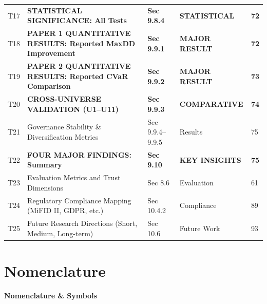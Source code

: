 \documentclass[11pt]{article}
\begin{document}
\begin{longtable}{C{1cm}L{7.8cm}L{1.9cm}L{1.9cm}C{1cm}}
T17 & \textbf{STATISTICAL SIGNIFICANCE: All Tests} & \textbf{Sec 9.8.4} & \textbf{STATISTICAL} & \textbf{72} \\
T18 & \textbf{PAPER 1 QUANTITATIVE RESULTS: Reported MaxDD Improvement} & \textbf{Sec 9.9.1} & \textbf{MAJOR RESULT} & \textbf{72} \\
T19 & \textbf{PAPER 2 QUANTITATIVE RESULTS: Reported CVaR Comparison} & \textbf{Sec 9.9.2} & \textbf{MAJOR RESULT} & \textbf{73} \\
T20 & \textbf{CROSS-UNIVERSE VALIDATION (U1--U11)} & \textbf{Sec 9.9.3} & \textbf{COMPARATIVE} & \textbf{74} \\
T21 & Governance Stability \& Diversification Metrics & Sec 9.9.4--9.9.5 & Results & 75 \\
T22 & \textbf{FOUR MAJOR FINDINGS: Summary} & \textbf{Sec 9.10} & \textbf{KEY INSIGHTS} & \textbf{75} \\
T23 & Evaluation Metrics and Trust Dimensions & Sec 8.6 & Evaluation & 61 \\
T24 & Regulatory Compliance Mapping (MiFID II, GDPR, etc.) & Sec 10.4.2 & Compliance & 89 \\
T25 & Future Research Directions (Short, Medium, Long-term) & Sec 10.6 & Future Work & 93 \\
\bottomrule
\end{longtable}
\normalsize

\fi
\clearpage
\tableofcontents
\clearpage
\listoffigures
{}
\clearpage
\listoftables
{}

\clearpage
\section*{Nomenclature}
\small
\textbf{Nomenclature \& Symbols}
\end{document}
